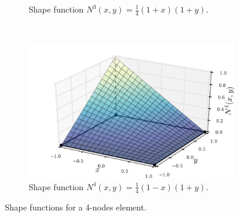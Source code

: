 \begin{figure}[H]
\begin{subfigure}[b]{0.45\textwidth}
		\caption{Shape function ${N^3(x,y)=\frac{1}{4}(1+x)(1+y)}$.}
	\end{subfigure}\,
%
	\begin{subfigure}[b]{0.45\textwidth}\qquad
		\includegraphics[width=\textwidth]{shape_func-4-nodes-4.pdf}
		\caption{Shape function ${N^4(x,y)=\frac{1}{4}(1-x)(1+y)}$.}
	\end{subfigure}
\caption{Shape functions for a 4-nodes element.}
\label{fig:four-nodes-interp}
\end{figure}

